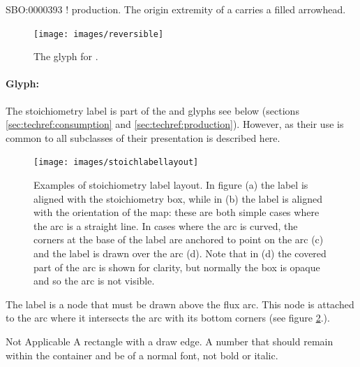 \begin{glyphDescription}
 \glyphSboTerm SBO:0000393 ! production.
 \glyphEndPoint The origin extremity of a  carries a filled arrowhead.
 \end{glyphDescription}

\begin{figure}[htb]
  \centering
  \texttt{[image: images/reversible]}
  \caption{The \PD glyph for .}
  \label{fig:techref:reversible}
\end{figure}


\paragraph{Glyph: }
\label{defn:stoichlabel}

The stoichiometry label is part of the  and
 glyphs see below (sections
\ref{sec:techref:consumption} and \ref{sec:techref:production}). However, as their use
is common to all subclasses of  their presentation
is described here.

\begin{figure}[htb]
  \centering
  \texttt{[image: images/stoichlabellayout]}
  \caption{Examples of stoichiometry label layout. In figure (a) the
    label is aligned with the stoichiometry box, while in (b) the
    label is aligned with the orientation of the map: these are both
    simple cases where the arc is a straight line. In cases where the
    arc is curved, the corners at the base of the label are anchored
    to point on the arc (c) and the label is drawn over the arc
    (d). Note that in (d) the covered part of the arc is shown for
    clarity, but normally the box is opaque and so the arc is not
    visible.}
  \label{fig:techref:stoichlabellayout}
\end{figure}

The label is a node that must be drawn above the flux arc. This node
is attached to the arc where it intersects the arc with its bottom
corners (see figure \ref{fig:techref:stoichlabellayout}.).

\begin{glyphDescription}
\glyphSboTerm Not Applicable
\glyphContainer A rectangle with a draw edge.
\glyphLabel A number that should remain within the container and be of
a normal font, \ie not bold or italic.
\end{glyphDescription}


